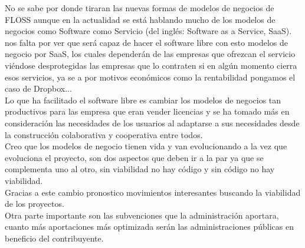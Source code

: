 \documentclass[12pt]{article} %
\begin{document}
No se sabe por donde tiraran las nuevas formas de modelos de negocios de FLOSS aunque en la actualidad se está hablando mucho de los modelos de negocios como Software como Servicio (del inglés: Software as a Service, SaaS). nos falta por ver que será capaz de hacer el software libre con esto modelos de negocio por SaaS, los cuales dependerán de las empresas que ofrezcan el servicio viéndose desprotegidas las empresas que lo contraten si en algún momento cierra esos servicios, ya se a por motivos económicos como la rentabilidad pongamos el caso de Dropbox...\\Lo que ha facilitado el software libre es cambiar los modelos de negocios tan productivos para las empresa que eran vender licencias y se ha tomado más en consideración las necesidades de los usuarios al adaptarse a sus necesidades desde la construcción colaborativa y cooperativa entre todos.\\Creo que los modelos de negocio tienen vida y van evolucionando a la vez que evoluciona el proyecto, son dos aspectos que deben ir a la par ya que se complementa uno al otro, sin viabilidad no hay código y sin código no hay viabilidad.\\Gracias a este cambio pronostico movimientos interesantes buscando la viabilidad de los proyectos.\\Otra parte importante son las subvenciones que la administración aportara, cuanto más aportaciones más optimizada serán las administraciones públicas en beneficio del contribuyente.
 
\end{document}
